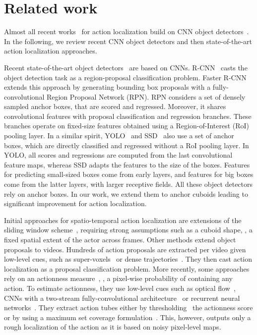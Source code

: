 \documentclass[10pt,twocolumn,letterpaper]{article}
\begin{document}
 \section{Related work}
\label{sec:related}

Almost all recent works~\cite{Peng16eccv,Suman16bmvc,singh16arxiv,Weinzaepfel15iccv} for action localization build on CNN object detectors~\cite{liu16eccv,ren15nips}. In the following, we review recent CNN object detectors and then state-of-the-art action localization approaches.  

Recent state-of-the-art object detectors~\cite{girshick14cvpr,liu16eccv,redmon16cvpr,ren15nips} are based on CNNs. R-CNN~\cite{girshick14cvpr} casts the object detection task as a region-proposal classification problem. Faster R-CNN~\cite{ren15nips} extends this approach by generating bounding box proposals with a fully-convolutional Region Proposal Network (RPN). RPN considers a set of densely sampled anchor boxes, that are scored and regressed. Moreover, it shares convolutional features with  proposal classification and regression branches. These branches operate on fixed-size features obtained using a Region-of-Interest (RoI) pooling layer. In a similar spirit, YOLO~\cite{redmon16cvpr} and SSD~\cite{liu16eccv} also use a set of anchor boxes, which are directly classified and regressed without a RoI pooling layer. In YOLO, all scores and regressions are computed from the last convolutional feature maps, whereas SSD adapts the features to the size of the boxes. 
Features for predicting small-sized boxes come from early layers, and features for big boxes come from the latter layers, with larger receptive fields.  All these object detectors rely on anchor boxes. In our work, we extend them to anchor cuboids leading to significant improvement for action localization. 


Initial approaches for spatio-temporal action localization are extensions of the sliding window scheme~\cite{msr2,Laptev07iccv}, requiring strong assumptions such as a cuboid shape, \ie, a fixed spatial extent of the actor across frames.  Other methods extend object proposals to videos. Hundreds of action proposals are extracted per video given low-level cues, such as super-voxels~\cite{jain14cvpr,oneata14eccv} or dense trajectories~\cite{chen15iccv,gemert15bmvc,marian15iccv}. They then cast action localization as a proposal classification problem.   
More recently, some approaches~\cite{li16arXiv,wang16cvpr,yu15cvpr} rely on an actionness measure~\cite{chen14cvpr}, \ie, a pixel-wise probability of containing any action. To estimate actionness, they use low-level cues such as optical flow~\cite{yu15cvpr}, CNNs with a two-stream fully-convolutional
architecture~\cite{wang16cvpr} or recurrent neural networks~\cite{wang16cvpr}. They extract action tubes either by thresholding~\cite{li16arXiv} the actionness score or by using a maximum set coverage formulation~\cite{yu15cvpr}. This, however, outputs only a rough localization of the action as it is based on noisy pixel-level maps.  
\end{document}
